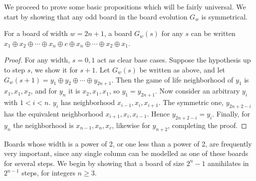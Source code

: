 \documentclass[12pt,letterpaper]{article}
\begin{document}

We proceed to prove some basic propositions which will be fairly universal. We start by showing that any odd board in the board evolution $G_w$ is symmetrical.
\begin{prop}[Symmetry]\label{symmetry}
  For a board of width $w=2n+1$, a board $G_w(s)$ for any $s$ can be written $x_1\oplus x_2\oplus\cdots\oplus x_n\oplus c \oplus x_n\oplus\cdots\oplus x_2\oplus x_1$.
\end{prop}
\begin{proof}
  For any width, $s=0,1$ act as clear base cases. Suppose the hypothesis up to step $s$, we show it for $s+1$. Let $G_w(s)$ be written as above, and let $G_w(s+1)=y_1\oplus y_2\oplus\cdots\oplus y_{2n+1}$. Then the game of life neighborhood of $y_1$ is $x_1,x_1,x_2$, and for $y_n$ it is $x_2,x_1,x_1$, so $y_1=y_{2n+1}$. Now consider an arbitrary $y_i$ with $1<i<n$. $y_i$ has neighborhood $x_{i-1},x_i,x_{i+1}$. The symmetric one, $y_{2n+2-i}$ has the equivalent neighborhood $x_{i+1},x_i,x_{i-1}$. Hence $y_{2n+2-i}=y_i$. Finally, for $y_n$ the neighborhood is $x_{n-1}, x_n, x_c$, likewise for $y_{n+2}$, completing the proof.
\end{proof}


Boards whose width is a power of 2, or one less than a power of 2, are frequently very important, since any single column can be modelled as one of these boards for several steps. We begin by showing that a board of size $2^n-1$ annihilates in $2^{n-1}$ steps, for integers $n\geq 3$.
\end{document}
